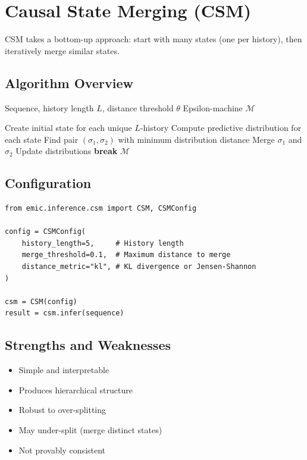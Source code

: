 \documentclass[11pt,a4paper]{report}
\theoremstyle{definition}
\theoremstyle{plain}
\begin{document}
\section{Causal State Merging (CSM)}

CSM takes a bottom-up approach: start with many states (one per history), then iteratively merge similar states.

\subsection{Algorithm Overview}

\begin{algorithm}
\caption{Causal State Merging}
\begin{algorithmic}[1]
\Require Sequence, history length $L$, distance threshold $\theta$
\Ensure Epsilon-machine $\mathcal{M}$

\State Create initial state for each unique $L$-history
\State Compute predictive distribution for each state
    \State Find pair $(\sigma_1, \sigma_2)$ with minimum distribution distance
        \State Merge $\sigma_1$ and $\sigma_2$
        \State Update distributions
    \Else
        \State \textbf{break}
    \EndIf
\EndWhile
\State \Return $\mathcal{M}$
\end{algorithmic}
\end{algorithm}

\subsection{Configuration}

\begin{lstlisting}[caption={CSM configuration}]
from emic.inference.csm import CSM, CSMConfig

config = CSMConfig(
    history_length=5,     # History length
    merge_threshold=0.1,  # Maximum distance to merge
    distance_metric="kl", # KL divergence or Jensen-Shannon
)

csm = CSM(config)
result = csm.infer(sequence)
\end{lstlisting}

\subsection{Strengths and Weaknesses}

\begin{itemize}
    \item[\checkmark] Simple and interpretable
    \item[\checkmark] Produces hierarchical structure
    \item[\checkmark] Robust to over-splitting
    \item[$\times$] May under-split (merge distinct states)
    \item[$\times$] Not provably consistent
\end{itemize}
\end{document}
